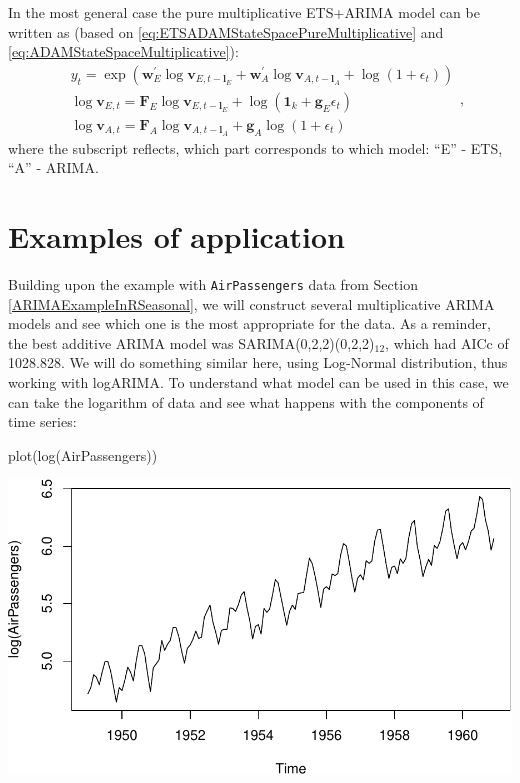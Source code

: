 \documentclass[
]{book}
\newenvironment{Shaded}{\begin{snugshade}}{\end{snugshade}}
\newcommand{\FunctionTok}[1]{\textcolor[rgb]{0.00,0.00,0.00}{#1}}
\newcommand{\NormalTok}[1]{#1}
\theoremstyle{definition}
\theoremstyle{definition}
\theoremstyle{definition}
\theoremstyle{definition}
\theoremstyle{remark}
\begin{document}
In the most general case the pure multiplicative ETS+ARIMA model can be written as (based on \eqref{eq:ETSADAMStateSpacePureMultiplicative} and \eqref{eq:ADAMStateSpaceMultiplicative}):
\begin{equation}
  \begin{aligned}
    &{y}_{t} = \exp \left( \mathbf{w}_{E}^\prime \log \mathbf{v}_{E,t-\mathbf{l}_E} + \mathbf{w}_{A}^\prime \log \mathbf{v}_{A,t-\mathbf{l}_A} + \log(1+\epsilon_t) \right) \\
        &\log \mathbf{v}_{E,t} = \mathbf{F}_{E} \log \mathbf{v}_{E,t-\mathbf{l}_E} + \log(\mathbf{1}_k + \mathbf{g}_E \epsilon_t) \\
    &\log \mathbf{v}_{A,t} = \mathbf{F}_{A} \log \mathbf{v}_{A,t-\mathbf{l}_A} + \mathbf{g}_A \log(1+\epsilon_t)
  \end{aligned} ,
  \label{eq:ADAMETSARIMA}
\end{equation}
where the subscript reflects, which part corresponds to which model: ``E'' - ETS, ``A'' - ARIMA.

\hypertarget{ADAMARIMAExamples}{%
\section{Examples of application}\label{ADAMARIMAExamples}}

Building upon the example with \texttt{AirPassengers} data from Section \ref{ARIMAExampleInRSeasonal}, we will construct several multiplicative ARIMA models and see which one is the most appropriate for the data. As a reminder, the best additive ARIMA model was SARIMA(0,2,2)(0,2,2)\(_{12}\), which had AICc of 1028.828. We will do something similar here, using Log-Normal distribution, thus working with logARIMA. To understand what model can be used in this case, we can take the logarithm of data and see what happens with the components of time series:

\begin{Shaded}
\begin{Highlighting}[]
\FunctionTok{plot}\NormalTok{(}\FunctionTok{log}\NormalTok{(AirPassengers))}
\end{Highlighting}
\end{Shaded}

\includegraphics{Svetunkov--2022----ADAM_files/figure-latex/unnamed-chunk-49-1.pdf}
\end{document}
